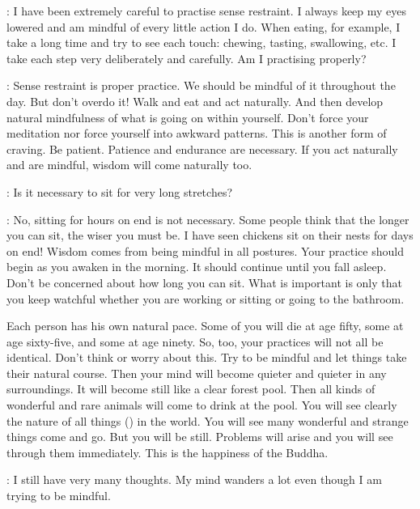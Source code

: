 :
I have been extremely careful to practise sense restraint. I always keep my eyes lowered and am mindful of every little action I do. When eating, for example, I take a long time and try to see each touch: chewing, tasting, swallowing, etc. I take each step very deliberately and carefully. Am I practising properly?

: Sense restraint is proper practice. We should be mindful of it throughout the day. But don't overdo it! Walk and eat and act naturally. And then develop natural mindfulness of what is going on within yourself. Don't force your meditation nor force yourself into awkward patterns. This is another form of craving. Be patient. Patience and endurance are necessary. If you act naturally and are mindful, wisdom will come naturally too.

:
Is it necessary to sit for very long stretches?

: No, sitting for hours on end is not necessary. Some people think that the longer you can sit, the wiser you must be. I have seen chickens sit on their nests for days on end! Wisdom comes from being mindful in all postures. Your practice should begin as you awaken in the morning. It should continue until you fall asleep. Don't be concerned about how long you can sit. What is important is only that you keep watchful whether you are working or sitting or going to the bathroom.

Each person has his own natural pace. Some of you will die at age fifty, some at age sixty-five, and some at age ninety. So, too, your practices will not all be identical. Don't think or worry about this. Try to be mindful and let things take their natural course. Then your mind will become quieter and quieter in any surroundings. It will become still like a clear forest pool. Then all kinds of wonderful and rare animals will come to drink at the pool. You will see clearly the nature of all things () in the world. You will see many wonderful and strange things come and go. But you will be still. Problems will arise and you will see through them immediately. This is the happiness of the Buddha.

:
I still have very many thoughts. My mind wanders a lot even though I am trying to be mindful.

